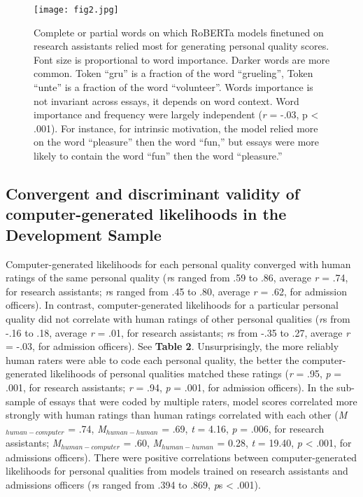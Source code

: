 \documentclass[11pt]{report}
\begin{document}
\begin{mainf}
\begin{figure}
    \centering
    \texttt{[image: fig2.jpg]}
    \caption{Complete or partial words on which RoBERTa models finetuned on research assistants relied most for generating personal quality scores. Font size is proportional to word importance.  Darker words are more common. Token ``gru'' is a fraction of the word ``grueling'', Token ``unte'' is a fraction of the word ``volunteer''. 
    Words importance is not invariant across essays, it depends on word context.
    Word importance and frequency were largely independent (\textit{r} = -.03, p < .001). For instance, for intrinsic motivation, the model relied more on the word ``pleasure'' then the word ``fun,'' but essays were more likely to contain the word ``fun'' then the word ``pleasure.''}
    \label{fig:interpret}
\end{figure}


\subsection{Convergent and discriminant validity of computer-generated likelihoods in the Development Sample}
Computer-generated likelihoods for each personal quality converged with human ratings of the same personal quality (\textit{r}s ranged from .59 to .86, average \textit{r} = .74, for research assistants; \textit{r}s ranged from .45 to .80, average \textit{r} = .62, for admission officers). In contrast, computer-generated likelihoods for a particular personal quality did not correlate with human ratings of other personal qualities (\textit{r}s from -.16 to .18, average \textit{r} = .01, for research assistants; \textit{r}s from -.35 to .27, average \textit{r} = -.03, for admission officers). See \textbf{Table 2}. Unsurprisingly, the more reliably human raters were able to code each personal quality, the better the computer-generated likelihoods of personal qualities matched these ratings (\textit{r} = .95, \textit{p} = .001, for research assistants; \textit{r} = .94, \textit{p} = .001, for admission officers). In the sub-sample of essays that were coded by multiple raters, model scores correlated more strongly with human ratings than human ratings correlated with each other (\textit{M}$_{human-computer}$ = .74, \textit{M}$_{human-human}$ = .69, \textit{t} = 4.16, \textit{p} = .006, for research assistants; \textit{M}$_{human-computer}$ = .60, \textit{M}$_{human-human}$ = 0.28, \textit{t} = 19.40, \textit{p} < .001, for admissions officers). There were positive correlations between computer-generated likelihoods for personal qualities from models trained on research assistants and admissions officers (\textit{r}s ranged from .394 to .869, \textit{p}s < .001).


\end{mainf}
\end{document}

